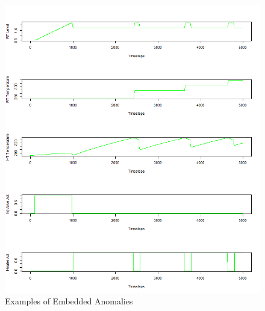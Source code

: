 \begin{figure}[h]
	\centering
	\includegraphics[scale=0.7]{Figures/GHL_data}
	\decoRule
	\caption[Temperature Dataset Anomalies]{Examples of Embedded Anomalies \parencite{Own}}
	\label{fig:GHL_data}
\end{figure}


